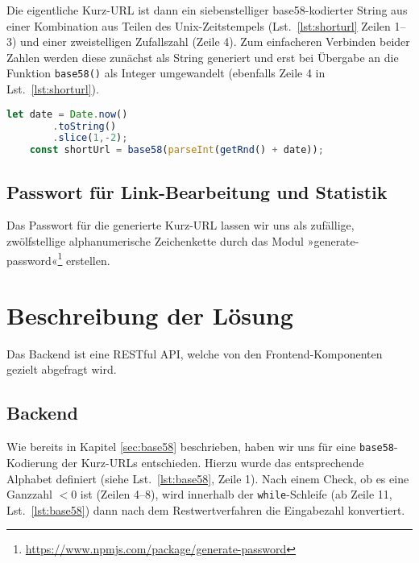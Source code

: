 \documentclass[a4paper,11pt,DIV=12]{scrreprt}%
\begin{document}
Die eigentliche Kurz-\ac{URL} ist dann ein siebenstelliger base58-kodierter String aus einer Kombination aus Teilen des Unix-Zeitstempels (Lst.~\ref{lst:shorturl} Zeilen 1–3) und einer zweistelligen Zufallszahl (Zeile 4). Zum einfacheren Verbinden beider Zahlen werden diese zunächst als String generiert und erst bei Übergabe an die Funktion \texttt{base58()} als Integer umgewandelt (ebenfalls Zeile 4 in Lst.~\ref{lst:shorturl}).

\begin{lstlisting}[language=JavaScript,
    caption={Aufbau der Basis vor der base58-Konvertierung},
    label={lst:shorturl},
    float=h,
    gobble=4
]
    let date = Date.now()
        .toString()
        .slice(1,-2);
    const shortUrl = base58(parseInt(getRnd() + date));
\end{lstlisting}



\section{Passwort für Link-Bearbeitung und Statistik}
Das Passwort für die generierte Kurz-\ac{URL} lassen wir uns als zufällige, zwölfstellige alphanumerische Zeichenkette durch das Modul »generate-password«\footnote{\href{https://www.npmjs.com/package/generate-password}{https://www.npmjs.com/package/generate-password}} erstellen.


\chapter{Beschreibung der Lösung}
Das Backend ist eine RESTful \ac{API}, welche von den Frontend-Komponenten gezielt abgefragt wird.

\section{Backend}
Wie bereits in Kapitel \ref{sec:base58} beschrieben, haben wir uns für eine \texttt{base58}-Kodierung der Kurz-\ac{URL}s entschieden. Hierzu wurde das entsprechende Alphabet definiert (siehe Lst.~\ref{lst:base58}, Zeile 1). Nach einem Check, ob es eine Ganzzahl $< 0$ ist (Zeilen 4–8), wird innerhalb der \texttt{while}-Schleife (ab Zeile 11, Lst.~\ref{lst:base58}) dann nach dem Restwertverfahren die Eingabezahl konvertiert.
\end{document}
